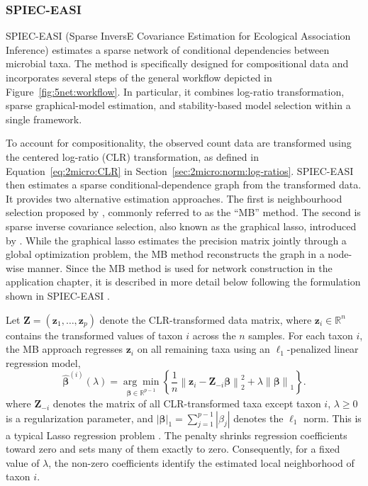 \subsubsection{SPIEC-EASI}
\label{sec:5net:net_constr:spieceasi}

SPIEC-EASI (Sparse InversE Covariance Estimation for Ecological Association Inference) \citep{kurtz2015sparse} estimates a sparse network of conditional dependencies between microbial taxa. The method is specifically designed for compositional  data and incorporates several steps of the general workflow depicted in Figure~\ref{fig:5net:workflow}. In particular, it combines log-ratio transformation, sparse graphical-model estimation, and stability-based model selection within a single framework.

To account for compositionality, the observed count data are transformed using the centered log-ratio (CLR) transformation, as defined in Equation~\eqref{eq:2micro:CLR} in Section~\ref{sec:2micro:norm:log-ratios}. SPIEC-EASI then estimates a sparse conditional-dependence graph from the transformed data. It provides two alternative estimation approaches. The first is neighbourhood selection proposed by \citet{meinshausen2006highdimensional}, commonly referred to as the ``MB'' method. The second is sparse inverse covariance selection, also known as the graphical lasso, introduced by \citet{friedman2008sparse}. While the graphical lasso estimates the precision matrix jointly through a global optimization problem, the MB method reconstructs the graph in a node-wise manner. Since the MB method is used for network construction in the application chapter, it is described in more detail below following the formulation shown in SPIEC-EASI \citep{kurtz2015sparse}.


Let $\mathbf{Z} = (\mathbf{z}_1,\ldots,\mathbf{z}_p)$ denote the CLR-transformed data matrix, where $\mathbf{z}_i \in \mathbb{R}^n$ contains the transformed values of taxon $i$ across the $n$ samples. For each taxon $i$, the MB approach regresses $\mathbf{z}_i$ on all remaining taxa using an $\ell_1$-penalized linear regression model,
\begin{equation}
\label{eq:5net:spieceasi_mb}
\hat{\boldsymbol{\beta}}^{(i)}(\lambda) =
\underset{\boldsymbol{\beta}\in\mathbb{R}^{p-1}}{\arg\min}
\left\{\frac{1}{n}\left\|\mathbf{z}_i - \mathbf{Z}_{-i}\boldsymbol{\beta} \right\|_2^2
+
\lambda \left\|\boldsymbol{\beta}\right\|_1\right\}.
\end{equation}
where $\mathbf{Z}_{-i}$ denotes the matrix of all CLR-transformed taxa except taxon $i$, $\lambda \geq 0$ is a regularization parameter, and $|\boldsymbol{\beta}|_1 = \sum_{j=1}^{p-1} |\beta_j|$ denotes the $\ell_1$ norm. This is a typical Lasso regression problem \citep{tibshirani1996regression}. The penalty shrinks regression coefficients toward zero and sets many of them exactly to zero. Consequently, for a fixed value of $\lambda$, the non-zero coefficients identify the estimated local neighborhood of taxon $i$.


